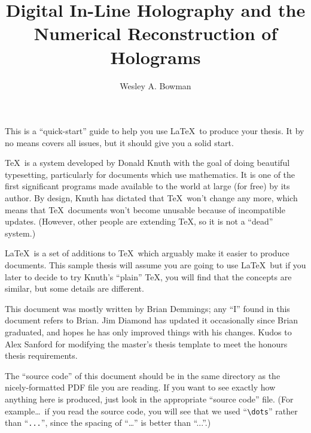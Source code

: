

\title{Digital In-Line Holography and the Numerical Reconstruction of Holograms}
\author{Wesley A. Bowman}

\beforepreface
{}

This is a ``quick-start'' guide to help you use \LaTeX\ to produce
your thesis.  It by no means covers all issues, but it should give you
a solid start.

\TeX\ is a system developed by Donald Knuth with the goal of doing
beautiful typesetting, particularly for documents which use
mathematics.  It is one of the first significant programs made
available to the world at large (for free) by its author.  By design,
Knuth has dictated that \TeX\ won't change any more, which means
that \TeX\ documents won't become unusable because of incompatible
updates.  (However, other people are extending \TeX, so it is not a
``dead'' system.)

\LaTeX\ is a set of additions to \TeX\ which arguably make it easier
to produce documents.  This sample thesis will assume you are going to
use \LaTeX\, but if you later to decide to try Knuth's ``plain'' \TeX,
you will find that the concepts are similar, but some details are
different.

This document was mostly written by Brian Demmings; any ``I'' found in
this document refers to Brian.  Jim Diamond has updated it
occasionally since Brian graduated, and hopes he has only improved
things with his changes.  Kudos to Alex Sanford for modifying the
master's thesis template to meet the honours thesis requirements.

The ``source code'' of this document should be in the same directory
as the nicely-formatted PDF file you are reading.  If you want to see
exactly how anything here is produced, just look in the appropriate
``source code'' file.  (For example\dots\ if you read the source code,
you will see that we used ``\verb|\dots|'' rather than ``\verb|...|'',
since the spacing of ``\dots'' is better than ``...''.)

